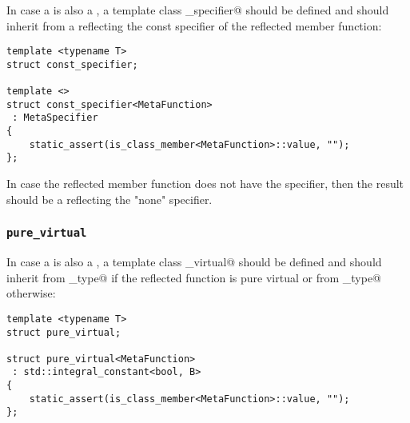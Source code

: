 In case a  is also a ,
a template class \verb@const_specifier@ should be defined and should inherit from
a  reflecting the const specifier of the reflected member function:

\begin{verbatim}
template <typename T>
struct const_specifier;

template <>
struct const_specifier<MetaFunction>
 : MetaSpecifier
{
	static_assert(is_class_member<MetaFunction>::value, "");
};
\end{verbatim}

In case the reflected member function does not have the \verb@const@ specifier,
then the result should be a  reflecting the "none" specifier.

\subsubsection{\texttt{pure\_virtual}}

In case a  is also a ,
a template class \verb@pure_virtual@ should be defined and should inherit from
\verb@true_type@ if the reflected function is pure virtual or from \verb@false_type@
otherwise:

\begin{verbatim}
template <typename T>
struct pure_virtual;

struct pure_virtual<MetaFunction>
 : std::integral_constant<bool, B>
{
	static_assert(is_class_member<MetaFunction>::value, "");
};
\end{verbatim}

